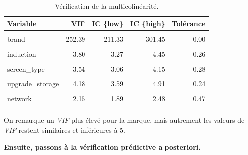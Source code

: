\documentclass[
  12pt,
]{report}
\begin{document}
\begin{table}[!h]

\caption{\label{tab:collinearity_log}Vérification de la multicolinéarité.}
\centering
\begin{tabular}[t]{lrrrr}
\toprule
\textbf{Variable} & \textbf{VIF} & \textbf{IC \{low\}} & \textbf{IC \{high\}} & \textbf{Tolérance}\\
\midrule
\cellcolor{gray!6}{storage} & \cellcolor{gray!6}{1.90} & \cellcolor{gray!6}{1.68} & \cellcolor{gray!6}{2.18} & \cellcolor{gray!6}{0.53}\\
brand & 252.39 & 211.33 & 301.45 & 0.00\\
\cellcolor{gray!6}{ram} & \cellcolor{gray!6}{3.68} & \cellcolor{gray!6}{3.17} & \cellcolor{gray!6}{4.31} & \cellcolor{gray!6}{0.27}\\
induction & 3.80 & 3.27 & 4.45 & 0.26\\
\cellcolor{gray!6}{screen\_size} & \cellcolor{gray!6}{1.62} & \cellcolor{gray!6}{1.45} & \cellcolor{gray!6}{1.86} & \cellcolor{gray!6}{0.62}\\
\addlinespace
screen\_type & 3.54 & 3.06 & 4.15 & 0.28\\
\cellcolor{gray!6}{made\_in} & \cellcolor{gray!6}{23.23} & \cellcolor{gray!6}{19.54} & \cellcolor{gray!6}{27.67} & \cellcolor{gray!6}{0.04}\\
upgrade\_storage & 4.18 & 3.59 & 4.91 & 0.24\\
\cellcolor{gray!6}{das\_limbs} & \cellcolor{gray!6}{2.06} & \cellcolor{gray!6}{1.81} & \cellcolor{gray!6}{2.37} & \cellcolor{gray!6}{0.49}\\
network & 2.15 & 1.89 & 2.48 & 0.47\\
\addlinespace
\cellcolor{gray!6}{ppi} & \cellcolor{gray!6}{2.89} & \cellcolor{gray!6}{2.51} & \cellcolor{gray!6}{3.37} & \cellcolor{gray!6}{0.35}\\
\bottomrule
\end{tabular}
\end{table}

\vspace{1em}

On remarque un \emph{VIF} plus élevé pour la marque, mais autrement les
valeurs de \emph{VIF} restent similaires et inférieures à 5.

\vspace{1em}

\textbf{Ensuite, passons à la vérification prédictive a posteriori.}

\vspace{1em}
\end{document}
